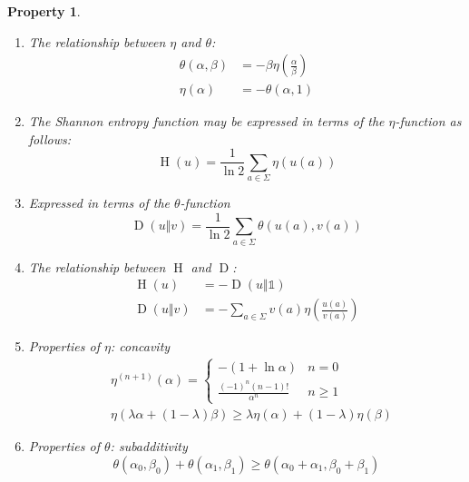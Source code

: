 \documentclass[aps,pra,onecolumn,notitlepage,superscriptaddress]{revtex4-1}
\newcommand{\op}[1]{\operatorname{#1}}
\newcommand\I{\mathds{1}}
\newtheorem{proper}{Property}
\begin{document}
    \begin{proper}
        \begin{enumerate}
            \item The relationship between $\eta$ and $\theta$:
            \begin{align}
                \theta(\alpha, \beta) &= -\beta \eta \left( \frac \alpha \beta \right) \\
                \eta(\alpha) &= - \theta(\alpha, 1)
            \end{align}
            \item The Shannon entropy function may be expressed in terms of the $\eta$-function as follows:
            \begin{equation}
                \op H(u) = \frac{1}{\ln 2} \sum_{a \in \Sigma} \eta(u(a))
            \end{equation}
            \item Expressed in terms of the $\theta$-function
            \begin{equation}
                \op D(u \Vert v) = \frac{1}{\ln 2} \sum_{a \in \Sigma} \theta (u(a), v(a))
            \end{equation}
            \item The relationship between $\op H$ and $\op D$:
            \begin{align}
                \op H(u) &= -\op D(u \Vert \I) \\
                \op D(u \Vert v) &= -\sum_{a \in \Sigma} v(a) \eta \left( \frac{u(a)}{v(a)} \right)
            \end{align}
            \item Properties of $\eta$: concavity
            \begin{align}
                &\eta^{(n+1)}(\alpha) = 
                \begin{cases}
                    -(1 + \ln \alpha) & n = 0 \\
                    \frac{(-1)^n (n-1)!}{\alpha^n} & n \geq 1
                \end{cases} \\
                &\eta(\lambda \alpha + (1-\lambda) \beta) \geq \lambda \eta(\alpha) + (1-\lambda) \eta(\beta)
            \end{align}
            \item Properties of $\theta$: subadditivity
            \begin{equation}
                \theta(\alpha_0,\beta_0) + \theta(\alpha_1,\beta_1) \geq \theta(\alpha_0 + \alpha_1, \beta_0 + \beta_1)

\end{equation}
\end{enumerate}
\end{proper}
\end{document}
